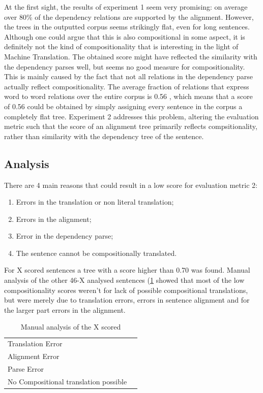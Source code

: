 \documentclass{report}
\theoremstyle{definition}
\theoremstyle{plain}
\begin{document}
At the first sight, the results of experiment 1 seem very promising: on average over 80\% of the dependency relations are supported by the alignment. However, the trees in the outputted corpus seems strikingly flat, even for long sentences. Although one could argue that this is also compositional in some aspect, it is definitely not the kind of compositionality that is interesting in the light of Machine Translation. The obtained score might have reflected the similarity with the dependency parses well, but seems no good measure for compositionality. This is mainly caused by the fact that not all relations in the dependency parse actually reflect compositionality. The average fraction of relations that express word to word relations over the entire corpus is 0.56 %
, which means that a score of 0.56 could be obtained by simply assigning every sentence in the corpus a completely flat tree. Experiment 2 addresses this problem, altering the evaluation metric such that the score of an alignment tree primarily reflects compsitionality, rather than similarity with the dependency tree of the sentence.


\subsection{Analysis}

There are 4 main reasons that could result in a low score for evaluation metric 2:
\begin{enumerate}
\item Errors in the translation or non literal translation;
\item Errors in the alignment;
\item Error in the dependency parse;
\item The sentence cannot be compositionally translated.
\end{enumerate}

For X scored sentences a tree with a score higher than 0.70 was found. Manual analysis of the other 46-X analysed sentences (\ref{tab:class} showed that most of the low compositionality scores weren't for lack of possible compositional translations, but were merely due to translation errors, errors in sentence alignment and for the larger part errors in the alignment.

\begin{table}[!h]\label{tab:class}
\begin{tabular}{|l|l|}
\hline
Translation Error & \\
Alignment Error & \\
Parse Error &\\
No Compositional translation possible & \\
\hline
\end{tabular}
\caption{Manual analysis of the X scored}
\end{table}
\end{document}
